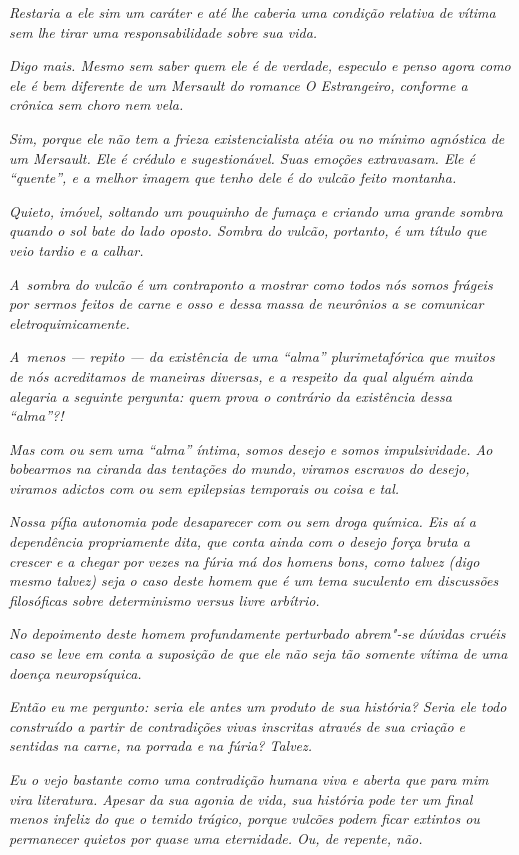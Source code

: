 \emph{Restaria a ele sim um caráter e até lhe caberia uma condição
relativa de vítima sem lhe tirar uma responsabilidade sobre sua vida.}~

\emph{Digo mais. Mesmo sem saber quem ele é de verdade, especulo e penso
agora como ele é bem diferente de um Mersault do romance O Estrangeiro,
conforme a crônica sem choro nem vela.}~

\emph{Sim, porque ele não tem a frieza existencialista atéia ou no
mínimo agnóstica de um Mersault. Ele é crédulo e sugestionável. Suas
emoções extravasam. Ele é ``quente'', e a melhor imagem que tenho dele é
do vulcão feito montanha.}~

\emph{Quieto, imóvel, soltando um pouquinho de fumaça e criando uma
grande sombra quando o sol bate do lado oposto. Sombra do vulcão,
portanto, é um título que veio tardio e a calhar.}~

\emph{A~sombra do vulcão é um contraponto a mostrar como todos nós somos
frágeis por sermos feitos de carne e osso e dessa massa de neurônios a
se comunicar eletroquimicamente.}~

\emph{A~menos --- repito --- da existência de uma ``alma''
plurimetafórica que muitos de nós acreditamos de maneiras diversas, e a
respeito da qual alguém ainda alegaria a seguinte pergunta: quem prova o
contrário da existência dessa ``alma''?!}~

\emph{Mas com ou sem uma ``alma'' íntima, somos desejo e somos
impulsividade. Ao bobearmos na ciranda das tentações do mundo, viramos
escravos do desejo, viramos adictos com ou sem epilepsias temporais ou
coisa e tal.}~

\emph{Nossa pífia autonomia pode desaparecer com ou sem droga química.
Eis aí a dependência propriamente dita, que conta ainda com o desejo
força bruta a crescer e a chegar por vezes na fúria má dos homens bons,
como talvez (digo mesmo talvez) seja o caso deste homem que é um tema
suculento em discussões filosóficas sobre determinismo versus livre
arbítrio.}~

\emph{No depoimento deste homem profundamente perturbado abrem"-se
dúvidas cruéis caso se leve em conta a suposição de que ele não seja tão
somente vítima de uma doença neuropsíquica.}~

\emph{Então eu me pergunto: seria ele antes um produto de sua história?
Seria ele todo construído a partir de contradições vivas inscritas
através de sua criação e sentidas na carne, na porrada e na fúria?
Talvez.}~

\emph{Eu o vejo bastante como uma contradição humana viva e aberta que
para mim vira literatura. Apesar da sua agonia de vida, sua história
pode ter um final menos infeliz do que o temido trágico, porque vulcões
podem ficar extintos ou permanecer quietos por quase uma eternidade. Ou,
de repente, não.}
